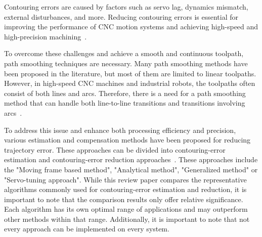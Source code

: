 Contouring errors are caused by factors such as servo lag, dynamics mismatch, external disturbances, and more. Reducing contouring errors is essential for improving the performance of CNC motion systems and achieving high-speed and high-precision machining~\cite{Jia.2018}. 

To overcome these challenges and achieve a smooth and continuous toolpath, path smoothing techniques are necessary. Many path smoothing methods have been proposed in the literature, but most of them are limited to linear toolpaths. However, in high-speed CNC machines and industrial robots, the toolpaths often consist of both lines and arcs. Therefore, there is a need for a path smoothing method that can handle both line-to-line transitions and transitions involving arcs~\cite{Shahzadeh.2018}. 


To address this issue and enhance both processing efficiency and precision, various estimation and compensation methods have been proposed for reducing trajectory error. These approaches can be divided into contouring-error estimation and contouring-error reduction approaches~\cite{Jia.2018}. These approaches include the "Moving frame based method", "Analytical method", "Generalized method" or "Servo-tuning
approach". While this review paper compares the representative algorithms commonly used for contouring-error estimation and reduction, it is important to note that the comparison results only offer relative significance. Each algorithm has its own optimal range of applications and may outperform other methods within that range. Additionally, it is important to note that not every approach can be implemented on every system.







